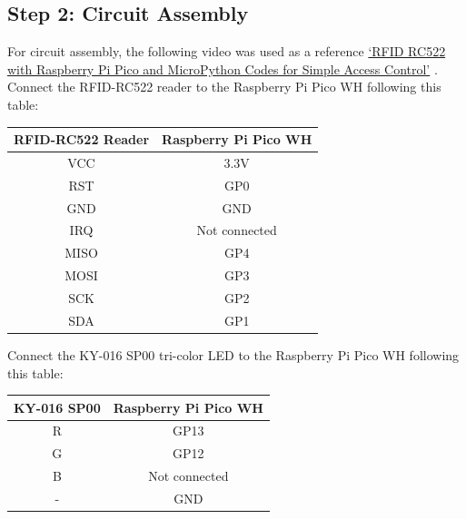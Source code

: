 \documentclass{article}
\begin{document}
\subsection{Step 2: Circuit Assembly}
For circuit assembly, the following video was used as a reference \href{https://www.youtube.com/watch?v=bvn_o39uXac}{`RFID RC522 with Raspberry Pi Pico and MicroPython Codes for Simple Access Control'} \cite{computadoras2022rfid}.\\
Connect the RFID-RC522 reader to the Raspberry Pi Pico WH following this table:

\begin{center}
	\begin{tabular}{|c|c|}
		\hline
		\textbf{RFID-RC522 Reader} & \textbf{Raspberry Pi Pico WH} \\
		\hline
		VCC & 3.3V \\
		\hline
		RST & GP0 \\
		\hline
		GND & GND \\
		\hline
		IRQ & Not connected \\
		\hline
		MISO & GP4 \\
		\hline
		MOSI & GP3 \\
		\hline
		SCK & GP2 \\
		\hline
		SDA & GP1 \\
		\hline
	\end{tabular}
\end{center}

\vspace{0.3cm}

Connect the KY-016 SP00 tri-color LED to the Raspberry Pi Pico WH following this table:
\begin{center}
	\begin{tabular}{|c|c|}
		\hline
		\textbf{KY-016 SP00} & \textbf{Raspberry Pi Pico WH} \\
		\hline
		R & GP13 \\
		\hline
		G & GP12 \\
		\hline
		B & Not connected \\
		\hline
		- & GND \\
		\hline
	\end{tabular}
\end{center}
\end{document}
